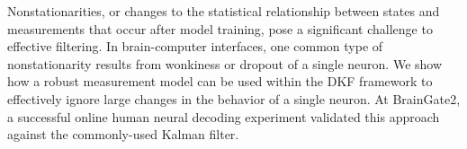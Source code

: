 Nonstationarities, or changes to the statistical relationship between states and measurements that occur after model training, pose a significant challenge to effective filtering.  In brain-computer interfaces, one common type of nonstationarity results from wonkiness or dropout of a single neuron.  We show how a robust measurement model can be used within the DKF framework to effectively ignore large changes in the behavior of a single neuron.  At BrainGate2, a successful online human neural decoding experiment validated this approach against the commonly-used Kalman filter. 


%
%

